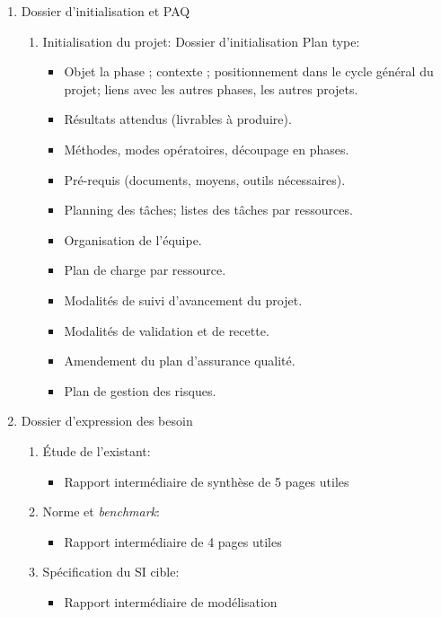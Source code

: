 \begin{enumerate}
	\item Dossier d'initialisation et PAQ
		\begin{enumerate}
			\item Initialisation du projet:
				Dossier d'initialisation
					Plan type:
						\begin{itemize}
							\item Objet la phase ; contexte ; positionnement
                                dans le cycle général du projet; liens avec
                                les autres phases, les autres projets.
							\item Résultats attendus (livrables à produire).
							\item Méthodes, modes opératoires, découpage en 
                                    phases.
							\item Pré-requis (documents, moyens, outils
                                    nécessaires).
							\item Planning des tâches; listes des tâches par
                                    ressources.
							\item Organisation de l'équipe.
							\item Plan de charge par ressource.
							\item Modalités de suivi d'avancement du projet.
							\item Modalités de validation et de recette.
							\item Amendement du plan d'assurance qualité.
							\item Plan de gestion des risques.
						\end{itemize}
		\end{enumerate}
	\item Dossier d'expression des besoin
		\begin{enumerate}
			\item Étude de l'existant:
				\begin{itemize}
					\item Rapport intermédiaire de synthèse de 5 pages utiles
				\end{itemize}
			\item Norme et \textsl{benchmark}:
				\begin{itemize} 
					\item Rapport intermédiaire de 4 pages utiles
				\end{itemize}
			\item Spécification du SI cible:
				\begin{itemize} 
					\item Rapport intermédiaire de modélisation
				\end{itemize}
		\end{enumerate}


\end{enumerate}
